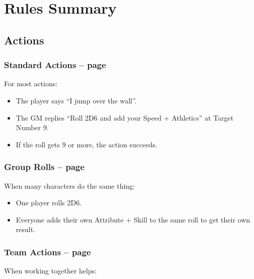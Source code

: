 \section*{Rules Summary}

\begin{multicols}{2}

\subsection{Actions}

\subsubsection{Standard Actions -- page \pageref{basicaction}}

For most actions:

\begin{itemize}

	\item{The player says ``I jump over the wall''.}
	\item{The GM replies ``Roll 2D6 and add your Speed + Athletics'' at Target Number 9.}
	\item{If the roll gets 9 or more, the action succeeds.}

\end{itemize}

\subsubsection{Group Rolls -- page \pageref{grouproll}}

When many characters do the same thing:

\begin{itemize}

	\item{One player rolls 2D6.}
	\item{Everyone adds their own Attribute + Skill to the same roll to get their own result.}

\end{itemize}

\subsubsection{Team Actions -- page \pageref{teamwork}}

When working together helps:

\begin{itemize}


\end{itemize}
\end{multicols}
